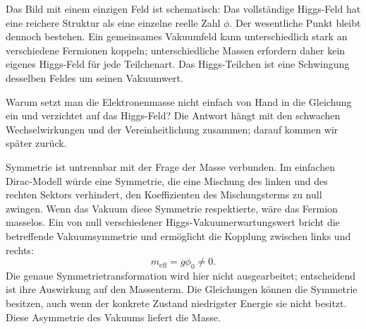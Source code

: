 Das Bild mit einem einzigen Feld ist schematisch: Das vollständige Higgs-Feld hat eine reichere Struktur als eine einzelne reelle Zahl \(\phi\). Der wesentliche Punkt bleibt dennoch bestehen. Ein gemeinsames Vakuumfeld kann unterschiedlich stark an verschiedene Fermionen koppeln; unterschiedliche Massen erfordern daher kein eigenes Higgs-Feld für jede Teilchenart. Das Higgs-Teilchen ist eine Schwingung desselben Feldes um seinen Vakuumwert.

Warum setzt man die Elektronenmasse nicht einfach von Hand in die Gleichung ein und verzichtet auf das Higgs-Feld? Die Antwort hängt mit den schwachen Wechselwirkungen und der Vereinheitlichung zusammen; darauf kommen wir später zurück.

\begin{classroomqa}
\end{classroomqa}

\begin{classroomqa}
\end{classroomqa}

Symmetrie ist untrennbar mit der Frage der Masse verbunden. Im einfachen Dirac-Modell würde eine Symmetrie, die eine Mischung des linken und des rechten Sektors verhindert, den Koeffizienten des Mischungsterms zu null zwingen. Wenn das Vakuum diese Symmetrie respektierte, wäre das Fermion masselos. Ein von null verschiedener Higgs-Vakuumerwartungswert bricht die betreffende Vakuumsymmetrie und ermöglicht die Kopplung zwischen links und rechts:
\begin{equation}
m_{\mathrm{eff}}=g\phi_0\neq0.
\end{equation}
Die genaue Symmetrietransformation wird hier nicht ausgearbeitet; entscheidend ist ihre Auswirkung auf den Massenterm. Die Gleichungen können die Symmetrie besitzen, auch wenn der konkrete Zustand niedrigster Energie sie nicht besitzt. Diese Asymmetrie des Vakuums liefert die Masse.

